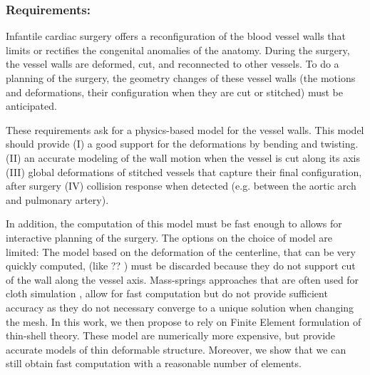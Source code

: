 \subsubsection{Requirements: } 
Infantile cardiac surgery offers a reconfiguration of the blood vessel walls that limits or rectifies the congenital anomalies of the anatomy.
During the surgery, the vessel walls are deformed, cut, and reconnected to other vessels.
To do a planning of the surgery, the geometry changes of these vessel walls (the motions and deformations, their configuration when they are cut or stitched)  must be anticipated.

These requirements ask for a physics-based model for the vessel walls. 
This model should provide 
(I) a good support for the deformations by bending and twisting. 
(II) an accurate modeling of the wall motion when the vessel is cut along its axis 
(III) global deformations of stitched vessels that capture their final configuration, after surgery 
(IV) collision response when detected (e.g. between the aortic arch and pulmonary artery). 

In addition, the computation of this model must be fast enough to allows for interactive planning of the surgery. 
The options on the choice of model are limited: 
The model based on the deformation of the centerline, that can be very quickly computed, (like ??   ) must be discarded because they do not support cut of the wall along the vessel axis. 
Mass-springs approaches that are often used for cloth simulation \cite{Volino2005b}, allow for fast computation but do not provide sufficient accuracy as they do not necessary converge to a unique solution when changing the mesh.
In this work, we then propose to rely on Finite Element formulation of thin-shell theory. 
These model are numerically more expensive, but provide accurate models of thin deformable structure.%
Moreover, we show that we can still obtain fast computation with a reasonable number of elements.

